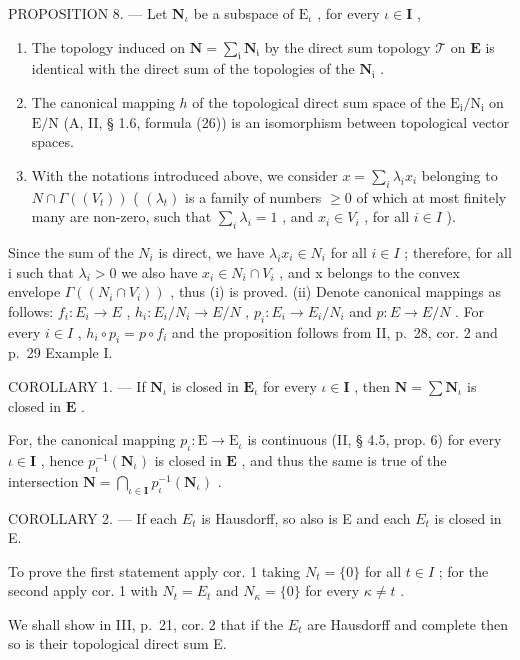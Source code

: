 PROPOSITION 8. --- Let \(\mathbf{N}_{\iota}\) be a subspace of \(\mathrm{E}_{\iota}\) , for every \(\iota \in \mathbf{I}\) ,

\begin{enumerate}
\def\labelenumi{(\roman{enumi})}
\item
  The topology induced on \(\mathbf{N} = \sum_{\mathfrak{i}}\mathbf{N}_{\mathfrak{i}}\) by the direct sum topology \(\mathcal{T}\) on \(\mathbf{E}\) is identical with the direct sum of the topologies of the \(\mathbf{N}_{\mathfrak{i}}\) .
\item
  The canonical mapping \(h\) of the topological direct sum space of the \(\mathrm{E}_{\mathrm{i}} / \mathrm{N}_{\mathrm{i}}\) on \(\mathrm{E} / \mathrm{N}\) (A, II, § 1.6, formula (26)) is an isomorphism between topological vector spaces.
\item
  With the notations introduced above, we consider \(x = \sum_{i} \lambda_i x_i\) belonging to \(N \cap \Gamma((V_{t}))\) ( \((\lambda_{t})\) is a family of numbers \(\geqslant 0\) of which at most finitely many are non-zero, such that \(\sum_{i} \lambda_{i} = 1\) , and \(x_{i} \in V_{i}\) , for all \(i \in I\) ).
\end{enumerate}

Since the sum of the \(N_{i}\) is direct, we have \(\lambda_{i}x_{i} \in N_{i}\) for all \(i \in I\) ; therefore, for all i such that \(\lambda_{i} > 0\) we also have \(x_{i} \in N_{i} \cap V_{i}\) , and x belongs to the convex envelope \(\Gamma((N_{i} \cap V_{i}))\) , thus (i) is proved. (ii) Denote canonical mappings as follows: \(f_{i}: E_{i} \to E\) , \(h_{i}: E_{i}/N_{i} \to E/N\) , \(p_{i}: E_{i} \to E_{i}/N_{i}\) and \(p: E \to E/N\) . For every \(i \in I\) , \(h_{i} \circ p_{i} = p \circ f_{i}\) and the proposition follows from II, p.~28, cor. 2 and p.~29 Example I.

COROLLARY 1. --- If \(\mathbf{N}_{\iota}\) is closed in \(\mathbf{E}_{\iota}\) for every \(\iota \in \mathbf{I}\) , then \(\mathbf{N} = \sum \mathbf{N}_{\iota}\) is closed in \(\mathbf{E}\) .

For, the canonical mapping \(p_{\iota} : \mathrm{E} \to \mathrm{E}_{\iota}\) is continuous (II, § 4.5, prop. 6) for every \(\iota \in \mathbf{I}\) , hence \(p_{\iota}^{-1}(\mathbf{N}_{\iota})\) is closed in \(\mathbf{E}\) , and thus the same is true of the intersection \(\mathbf{N} = \bigcap_{\iota \in \mathbf{I}} p_{\iota}^{-1}(\mathbf{N}_{\iota})\) .

COROLLARY 2. --- If each \(E_{t}\) is Hausdorff, so also is E and each \(E_{t}\) is closed in E.

To prove the first statement apply cor. 1 taking \(N_{t} = \{0\}\) for all \(t \in I\) ; for the second apply cor. 1 with \(N_{t} = E_{t}\) and \(N_{\kappa} = \{0\}\) for every \(\kappa \neq t\) .

We shall show in III, p.~21, cor. 2 that if the \(E_{t}\) are Hausdorff and complete then so is their topological direct sum E.

